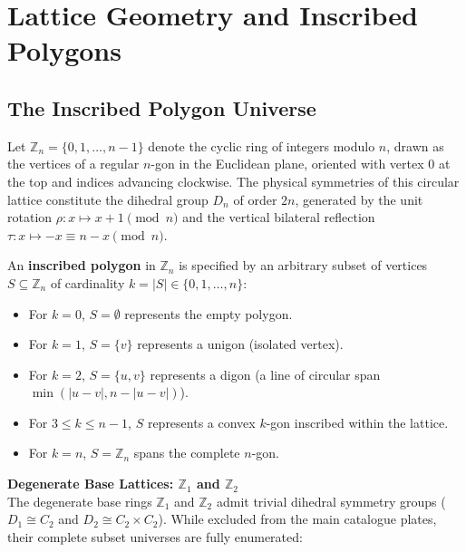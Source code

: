 \chapter{Lattice Geometry and Inscribed Polygons}
\label{chap:polygon-geometry}

\section{The Inscribed Polygon Universe}

Let $\mathbb{Z}_n = \{0, 1, \dots, n-1\}$ denote the cyclic ring of
integers modulo $n$, drawn as the vertices of a regular
$n$-gon in the Euclidean plane, oriented with vertex $0$ at the top
and indices advancing clockwise. The physical symmetries of this circular
lattice constitute the dihedral group $D_n$ of order $2n$, generated by
the unit rotation $\rho \colon x \mapsto x + 1 \pmod n$ and the vertical
bilateral reflection $\tau \colon x \mapsto -x \equiv n - x \pmod n$.

An \textbf{inscribed polygon} in $\mathbb{Z}_n$ is specified by an
arbitrary subset of vertices $S \subseteq \mathbb{Z}_n$ of cardinality
$k = |S| \in \{0, 1, \dots, n\}$:
\begin{itemize}
    \item For $k = 0$, $S = \emptyset$ represents the empty polygon.
    \item For $k = 1$, $S = \{v\}$ represents a unigon (isolated vertex).
    \item For $k = 2$, $S = \{u, v\}$ represents a digon (a line of circular span $\min(|u-v|, n-|u-v|)$).
    \item For $3 \le k \le n-1$, $S$ represents a convex $k$-gon inscribed within the lattice.
    \item For $k = n$, $S = \mathbb{Z}_n$ spans the complete $n$-gon.
\end{itemize}

\noindent\textbf{Degenerate Base Lattices: $\mathbb{Z}_1$ and $\mathbb{Z}_2$}\\[0.5em]

The degenerate base rings $\mathbb{Z}_1$ and $\mathbb{Z}_2$ admit trivial
dihedral symmetry groups ($D_1 \cong C_2$ and $D_2 \cong C_2 \times
C_2$). While excluded from the main catalogue plates, their complete
subset universes are fully enumerated:

